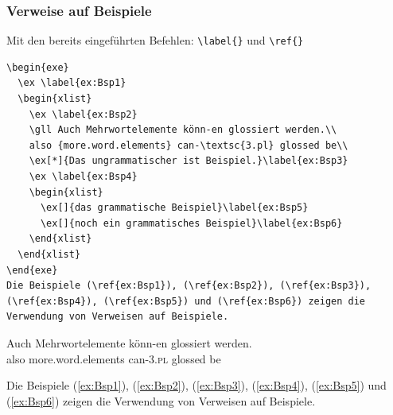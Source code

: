 \begin{frame}[fragile]
\frametitle{Verweise auf Beispiele}

Mit den bereits eingeführten Befehlen: \lstinline|\label{}| und \lstinline|\ref{}| 
{\footnotesize
\begin{lstlisting}
\begin{exe}
  \ex \label{ex:Bsp1}
  \begin{xlist}
    \ex \label{ex:Bsp2}
    \gll Auch Mehrwortelemente könn-en glossiert werden.\\
    also {more.word.elements} can-\textsc{3.pl} glossed be\\
    \ex[*]{Das ungrammatischer ist Beispiel.}\label{ex:Bsp3}
    \ex \label{ex:Bsp4}
    \begin{xlist}
      \ex[]{das grammatische Beispiel}\label{ex:Bsp5}
      \ex[]{noch ein grammatisches Beispiel}\label{ex:Bsp6}
    \end{xlist}	
  \end{xlist}
\end{exe}
Die Beispiele (\ref{ex:Bsp1}), (\ref{ex:Bsp2}), (\ref{ex:Bsp3}),
(\ref{ex:Bsp4}), (\ref{ex:Bsp5}) und (\ref{ex:Bsp6}) zeigen die 
Verwendung von Verweisen auf Beispiele.
\end{lstlisting}
}
\end{frame}



\begin{frame}

\begin{exe}
	\ex \label{ex:Bsp1}
	\begin{xlist}
		\ex \label{ex:Bsp2}
		\gll Auch Mehrwortelemente könn-en glossiert werden.\\
		also {more.word.elements} can-\textsc{3.pl} glossed be\\
		\label{ex:Bsp3}
		\ex \label{ex:Bsp4}
		\begin{xlist}
			\label{ex:Bsp5}
			\label{ex:Bsp6}
		\end{xlist}	
	\end{xlist}
\end{exe}
Die Beispiele (\ref{ex:Bsp1}), (\ref{ex:Bsp2}), (\ref{ex:Bsp3}), (\ref{ex:Bsp4}), (\ref{ex:Bsp5}) und (\ref{ex:Bsp6}) zeigen die Verwendung von Verweisen auf Beispiele.

\end{frame}


